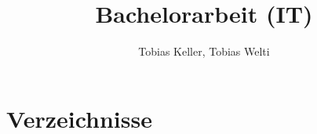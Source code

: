 %
%




\title{Bachelorarbeit (IT)}
\author{Tobias Keller, Tobias Welti}





\setcounter{page}{1}



\tableofcontents
\listoftodos
\newpage















\chapter{Verzeichnisse}\label{chap.verzeichnisse}
 
  \newpage
 \listoffigures
 \listoftables
 \printglossary
 \printglossary[type=acronym]
 \lstlistoflistings
 




